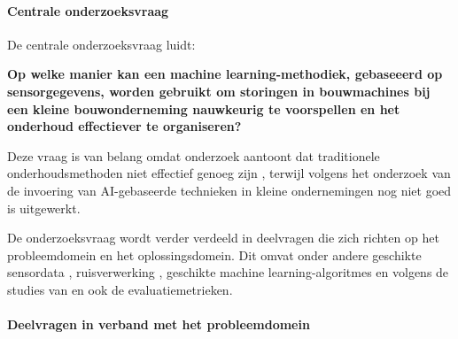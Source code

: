 \paragraph{Centrale onderzoeksvraag}

De centrale onderzoeksvraag luidt:

\textbf{Op welke manier kan een machine learning-methodiek, gebaseeerd op sensorgegevens, worden gebruikt om storingen in bouwmachines bij een kleine bouwonderneming nauwkeurig te voorspellen en het onderhoud effectiever te organiseren?}

Deze vraag is van belang omdat onderzoek aantoont dat traditionele onderhoudsmethoden niet effectief genoeg zijn \autocite{Deepak2025, Mikulic2024}, terwijl volgens het onderzoek van \textcite{Elahi2023} de invoering van AI-gebaseerde technieken in kleine ondernemingen nog niet goed is uitgewerkt.

De onderzoeksvraag wordt verder verdeeld in deelvragen die zich richten op het probleemdomein en het oplossingsdomein.
Dit omvat onder andere geschikte sensordata \autocite{Nayak2024}, ruisverwerking \autocite{Wang2025}, geschikte machine learning-algoritmes \autocite{Giannoulidis2024, Aggarwal2025} en volgens de studies van \textcite{Roehrich2024} en \textcite{Mahale2025} ook de evaluatiemetrieken.



\paragraph{Deelvragen in verband met het probleemdomein}

